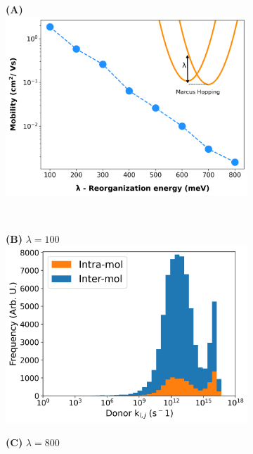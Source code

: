 \begin{figure}
\centering
\begin{subfigure}{\textwidth}
    \textbf{(A)} \\
    \centering
    \includegraphics[width=.8\textwidth]{figures/reorg-log-yaxis.png}
    \newline
\end{subfigure}%
\\
\begin{subfigure}{.5\textwidth}
    \textbf{(B)} $\lambda = 100$
    \centering
    \includegraphics[width=\textwidth]{figures/donor_hopping_rate_clusters_reorg100.png}
\end{subfigure}%
\begin{subfigure}{.5\textwidth}
    \textbf{(C)} $\lambda = 800$
    \centering

\end{subfigure}
\end{figure}
